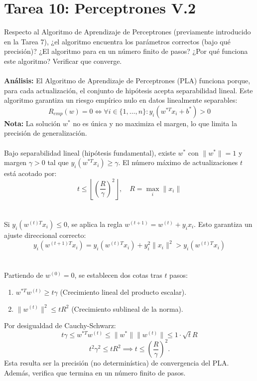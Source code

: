 \documentclass{article}
\begin{document}
\section{Tarea 10: Perceptrones V.2}
\noindent Respecto al Algoritmo de Aprendizaje de Perceptrones (previamente introducido en la Tarea 7), ¿el algoritmo encuentra los parámetros correctos (bajo qué precisión)? ¿El algoritmo para en un número finito de pasos? ¿Por qué funciona este algoritmo? Verificar que converge. \\ \\
\textbf{Análisis:} El Algoritmo de Aprendizaje de Perceptrones (PLA) funciona porque, para cada actualización, el conjunto de hipótesis acepta separabilidad lineal. Este algoritmo garantiza un riesgo empírico nulo en datos linealmente separables:
$$R_{emp}(w) = 0 \iff \forall i \in \{1, \dots, n\}: y_i(w^{*T}x_i + b^*) > 0$$
\textbf{Nota:} La solución $w^*$ no es única y no maximiza el margen, lo que limita la precisión de generalización. \\ \\
Bajo separabilidad lineal (hipótesis fundamental), existe $w^*$ con $\|w^*\| = 1$ y margen $\gamma > 0$ tal que $y_i(w^{*T}x_i) \geq \gamma$. El número máximo de actualizaciones $t$ está acotado por:
$$t \leq \left\lfloor \left( \frac{R}{\gamma} \right)^2 \right\rfloor, \quad R = \max_i \|x_i\|$$ \\ \\
Si $y_i(w^{(t)T}x_i) \leq 0$, se aplica la regla $w^{(t+1)} = w^{(t)} + y_i x_i$. Esto garantiza un ajuste direccional correcto:
$$y_i(w^{(t+1)T}x_i) = y_i(w^{(t)T}x_i) + y_i^2\|x_i\|^2 > y_i(w^{(t)T}x_i)$$ \\ \\
Partiendo de $w^{(0)} = 0$, se establecen dos cotas tras $t$ pasos:
\begin{enumerate}
    \item $w^{*T}w^{(t)} \geq t\gamma$ (Crecimiento lineal del producto escalar).
    \item $\|w^{(t)}\|^2 \leq tR^2$ (Crecimiento sublineal de la norma).
\end{enumerate}
Por desigualdad de Cauchy-Schwarz:
$$t\gamma \leq w^{*T}w^{(t)} \leq \|w^*\| \|w^{(t)}\| \leq 1 \cdot \sqrt{t}R$$
$$t^2\gamma^2 \leq tR^2 \implies t \leq \left( \frac{R}{\gamma} \right)^2.$$ Esta resulta ser la precisión (no determinística) de convergencia del PLA. Además, verifica que termina en un número finito de pasos.
\end{document}
